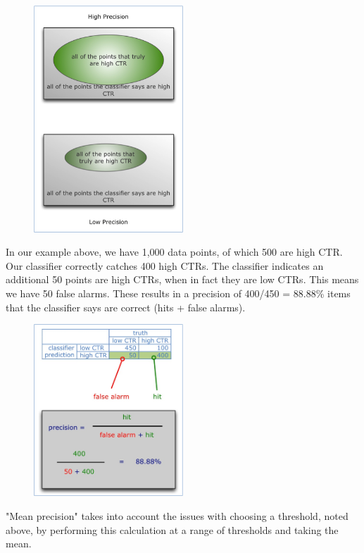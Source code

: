 \begin{figure}
\centering
\includegraphics[width=0.5\textwidth]{img/testclass/6.png}
\caption{
}
\label{Fig.1}
\end{figure}

In our example above, we have 1,000 data points, of which 500 are high CTR. Our classifier correctly catches 400 high CTRs. The classifier indicates an additional 50 points are high CTRs, when in fact they are low CTRs. This means we have 50 false alarms. These results in a precision of 400/450 = 88.88\% items that the classifier says are correct (hits + false alarms).

\begin{figure}
\centering
\includegraphics[width=0.5\textwidth]{img/testclass/7.png}
\caption{
}
\label{Fig.1}
\end{figure}

"Mean precision" takes into account the issues with choosing a threshold, noted above, by performing this calculation at a range of thresholds and taking the mean.

